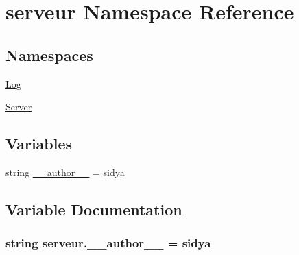 \hypertarget{namespaceserveur}{}\section{serveur Namespace Reference}
\label{namespaceserveur}
\subsection*{Namespaces}
\begin{DoxyCompactItemize}
\item 
 \hyperlink{namespaceserveur_1_1_log}{Log}
\item 
 \hyperlink{namespaceserveur_1_1_server}{Server}
\end{DoxyCompactItemize}
\subsection*{Variables}
\begin{DoxyCompactItemize}
\item 
string \hyperlink{namespaceserveur_a5607de2721f99854c9c557d1fef0bd25}{\+\_\+\+\_\+author\+\_\+\+\_\+} = \textquotesingle{}sidya\textquotesingle{}
\end{DoxyCompactItemize}


\subsection{Variable Documentation}
\hypertarget{namespaceserveur_a5607de2721f99854c9c557d1fef0bd25}{}
\subsubsection[{\+\_\+\+\_\+author\+\_\+\+\_\+}]{\setlength{\rightskip}{0pt plus 5cm}string serveur.\+\_\+\+\_\+author\+\_\+\+\_\+ = \textquotesingle{}sidya\textquotesingle{}}\label{namespaceserveur_a5607de2721f99854c9c557d1fef0bd25}
